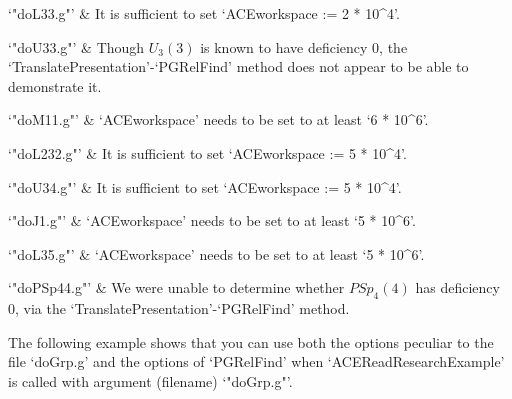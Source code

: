 \quad`"doL33.g"' &
It is sufficient to set `ACEworkspace := 2 * 10^4'.

\quad`"doU33.g"' &
Though   $U_3(3)$   is   known   to    have    deficiency    0,    the
`TranslatePresentation'-`PGRelFind' method does not appear to be  able
to demonstrate it.

\quad`"doM11.g"' &
`ACEworkspace' needs to be set to at least `6 * 10^6'.

\quad`"doL232.g"' &
It is sufficient to set `ACEworkspace := 5 * 10^4'.

\quad`"doU34.g"' &
It is sufficient to set `ACEworkspace := 5 * 10^4'.

\quad`"doJ1.g"' &
`ACEworkspace' needs to be set to at least `5 * 10^6'.

\quad`"doL35.g"' &
`ACEworkspace' needs to be set to at least `5 * 10^6'.

\quad`"doPSp44.g"' &
We were unable to determine whether $PSp_4(4)$ has deficiency  0,  via
the `TranslatePresentation'-`PGRelFind' method.

\enditems

The following example shows that you can use both the options peculiar
to  the  file  `doGrp.g'  and  the   options   of   `PGRelFind'   when
`ACEReadResearchExample'   is   called   with   argument    (filename)
`"doGrp.g"'.

